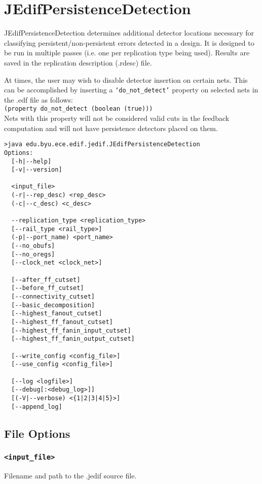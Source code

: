 \section{JEdifPersistenceDetection}
JEdifPersistenceDetection determines additional detector locations necessary
for classifying persistent/non-persistent errors detected in a design. It is
designed to be run in multiple passes (i.e. one per replication type being
used). Results are saved in the replication description (.rdesc) file.

At times, the user may wish to disable detector insertion on certain nets. This
can be accomplished by inserting a \texttt{`do\_not\_detect'} property on
selected nets in the .edf file as follows:\\
\texttt{(property do\_not\_detect (boolean (true)))}\\

Nets with this property will not be considered valid cuts in the feedback
computation and will not have persistence detectors placed on them.

\begin{verbatim}
>java edu.byu.ece.edif.jedif.JEdifPersistenceDetection
Options:
  [-h|--help]
  [-v|--version]

  <input_file>
  (-r|--rep_desc) <rep_desc>
  (-c|--c_desc) <c_desc>

  --replication_type <replication_type>
  [--rail_type <rail_type>]
  (-p|--port_name) <port_name>
  [--no_obufs]
  [--no_oregs]
  [--clock_net <clock_net>]

  [--after_ff_cutset]
  [--before_ff_cutset]
  [--connectivity_cutset]
  [--basic_decomposition]
  [--highest_fanout_cutset]
  [--highest_ff_fanout_cutset]
  [--highest_ff_fanin_input_cutset]
  [--highest_ff_fanin_output_cutset]

  [--write_config <config_file>]
  [--use_config <config_file>]

  [--log <logfile>]
  [--debug[:<debug_log>]]
  [(-V|--verbose) <{1|2|3|4|5}>]
  [--append_log]
\end{verbatim}
\subsection{File Options}

\subsubsection{\texttt{<input\_file>}}
Filename and path to the .jedif source file.

